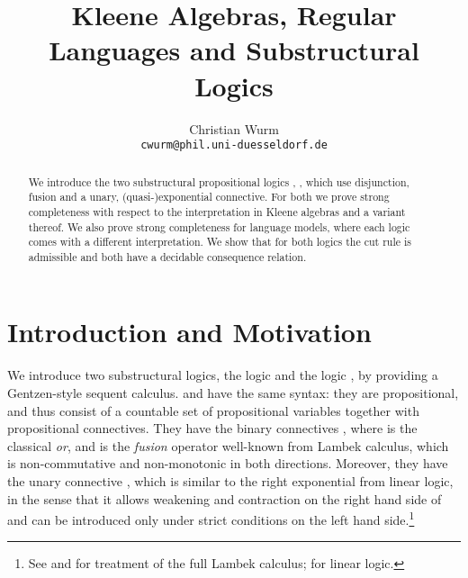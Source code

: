 \documentclass{eptcs}
\title{Kleene Algebras, Regular Languages and Substructural Logics}
\author{Christian Wurm \\
\texttt{cwurm@phil.uni-duesseldorf.de}}
\begin{document}
\maketitle
\begin{abstract}
We introduce the two substructural propositional logics , , 
which use disjunction, fusion and a unary, (quasi-)exponential 
connective. For both we prove strong completeness
with respect to the interpretation in Kleene 
algebras and a variant thereof.
We also prove strong completeness  for language models, where each
logic comes with a different interpretation.
We show that for both logics the cut rule is 
admissible and both have a decidable consequence relation.
\end{abstract}


\section{Introduction and Motivation}

We introduce two substructural logics, the logic  and
the logic , by providing a Gentzen-style sequent calculus.
 and  have the same syntax: they are propositional, 
and thus consist of a countable set of propositional variables together with
propositional connectives. They have the binary
connectives , where  is the classical \textit{or},
and  is the \textit{fusion} operator well-known from 
Lambek calculus, which is non-commutative and non-monotonic in
both directions. Moreover, they have the unary connective , which is similar
to the right exponential from linear logic, in the sense that it 
allows weakening and contraction on the right hand side of 
and can be introduced only under strict conditions on the left hand 
side.\footnote{See \cite{galatos:residuated} and \cite{restall:introduction} 
for treatment of the full Lambek calculus; \cite{girard:linear} for 
linear logic.}
\end{document}
